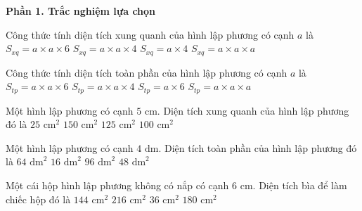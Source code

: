 \textbf{Phần 1. Trắc nghiệm lựa chọn}

\begin{ex} %
Công thức tính diện tích xung quanh của hình lập phương có cạnh $a$ là
\choice
{$S_{xq} = a \times a \times 6$}
{\True $S_{xq} = a \times a \times 4$}
{$S_{xq} = a \times 4$}
{$S_{xq} = a \times a \times a$}
\end{ex}

\begin{ex} %
Công thức tính diện tích toàn phần của hình lập phương có cạnh $a$ là
\choice
{\True $S_{tp} = a \times a \times 6$}
{$S_{tp} = a \times a \times 4$}
{$S_{tp} = a \times 6$}
{$S_{tp} = a \times a \times a$}
\end{ex}

\begin{ex} %
Một hình lập phương có cạnh $5\text{ cm}$. Diện tích xung quanh của hình lập phương đó là
\choice
{$25\text{ cm}^2$}
{$150\text{ cm}^2$}
{$125\text{ cm}^2$}
{\True $100\text{ cm}^2$}
\end{ex}

\begin{ex} %
Một hình lập phương có cạnh $4\text{ dm}$. Diện tích toàn phần của hình lập phương đó là
\choice
{$64\text{ dm}^2$}
{$16\text{ dm}^2$}
{\True $96\text{ dm}^2$}
{$48\text{ dm}^2$}
\end{ex}

\begin{ex} %
Một cái hộp hình lập phương không có nắp có cạnh $6\text{ cm}$. Diện tích bìa để làm chiếc hộp đó là
\choice
{$144\text{ cm}^2$}
{$216\text{ cm}^2$}
{$36\text{ cm}^2$}
{\True $180\text{ cm}^2$}
\end{ex}

